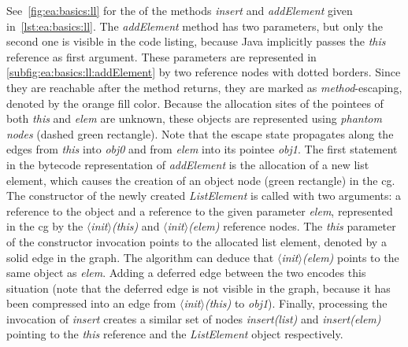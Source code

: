 			See~\cref{fig:ea:basics:ll} for the  of the methods \emph{insert} and \emph{addElement} given
			in~\cref{lst:ea:basics:ll}. The \emph{addElement} method has two parameters, but only the second one is visible in
			the code listing, because Java implicitly passes the \emph{this} reference as first argument. These parameters are
			represented in \cref{subfig:ea:basics:ll:addElement} by two reference nodes with dotted borders. Since they are
			reachable after the method returns, they are marked as \emph{method}-escaping, denoted by the orange fill color.
			Because the allocation sites of the pointees of both \emph{this} and \emph{elem} are unknown, these objects are
			represented using \emph{phantom nodes} (dashed green rectangle). Note that the escape state propagates along the
			edges from \emph{this} into \emph{obj0} and from \emph{elem} into its pointee \emph{obj1}. The first statement in
			the bytecode representation of \emph{addElement} is the allocation of a new list element, which causes the
			creation of an object node (green rectangle) in the \gls{cg}. The constructor of the newly created
			\emph{ListElement} is called with two arguments: a reference to the object and a reference to the given parameter
			\emph{elem}, represented in the \acrlong{cg} by the \emph{$\langle$init$\rangle$(this)} and
			\emph{$\langle$init$\rangle$(elem)} reference nodes. The \emph{this} parameter of the constructor invocation
			points to the allocated list element, denoted by a solid edge in the graph. The algorithm can deduce that
			\emph{$\langle$init$\rangle$(elem)} points to the same object as \emph{elem}. Adding a deferred edge between the
			two encodes this situation (note that the deferred edge is not visible in the graph, because it has been
			compressed into an edge from \emph{$\langle$init$\rangle$(this)} to \emph{obj1}). Finally, processing the
			invocation of \emph{insert} creates a similar set of nodes \emph{insert(list)} and \emph{insert(elem)} pointing to
			the \emph{this} reference and the \emph{ListElement} object respectively.

